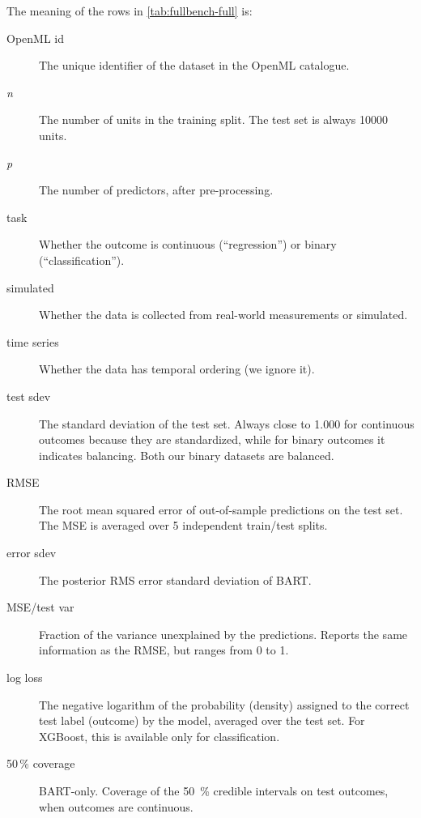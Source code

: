 \documentclass{article}
\begin{document}
The meaning of the rows in \autoref{tab:fullbench-full} is:
%
\begin{description}
	
	\item[OpenML id] The unique identifier of the dataset in the OpenML
		catalogue.

	\item[\textit{n}] The number of units in the training split. The test set is
		always \num{10000} units.

	\item[\textit{p}] The number of predictors, after pre-processing.

	\item[task] Whether the outcome is continuous (``regression'') or
		binary (``classification'').
	
	\item[simulated] Whether the data is collected from real-world
		measurements or simulated.

	\item[time series] Whether the data has temporal ordering (we ignore
		it).

	\item[test sdev] The standard deviation of the test set. Always close
		to 1.000 for continuous outcomes because they are standardized,
		while for binary outcomes it indicates balancing. Both our
		binary datasets are balanced.

	\item[RMSE] The root mean squared error of out-of-sample predictions on
		the test set. The MSE is averaged over 5 independent train/test
		splits.

	\item[error sdev] The posterior RMS error standard deviation of BART.

	\item[MSE/test var] Fraction of the variance unexplained by the
		predictions. Reports the same information as the RMSE, but
		ranges from 0 to 1.

	\item[log loss] The negative logarithm of the probability (density) assigned to the
		correct test label (outcome) by the model, averaged over the test set.
		For XGBoost, this is available only for classification.

	\item[50\,\% coverage] BART-only. Coverage of the \SI{50}{\%} credible
		intervals on test outcomes, when outcomes are continuous.


\end{description}
\end{document}

